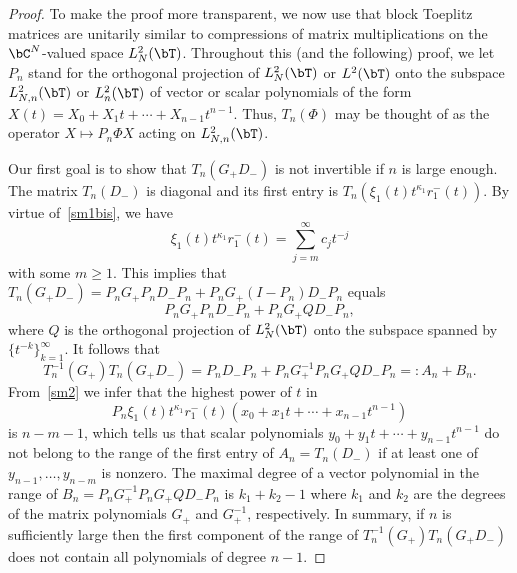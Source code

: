 \documentclass[addpoints,12pt,letter]{article}
\newcommand{\ka}{\kappa}
\newcommand{\nf}{\infty}
\newcommand{\Ph}{\Phi}
\renewcommand{\ge}{\geqslant}
\numberwithin{equation}{section}
\theoremstyle{definition}
\begin{document}
\begin{proof}
To make the proof more transparent, we now use that block Toeplitz matrices are unitarily similar to compressions of matrix multiplications on the $\bC^N$-valued space $L^{2}_N(\bT)$.
Throughout this (and the following) proof, we let $P_{n}$ stand for the orthogonal projection of $L^{2}_N(\bT)$ or $L^{2}(\bT)$ onto the subspace $L^{2}_{N,n}(\bT)$ or $L^{2}_{n}(\bT)$ of vector or scalar polynomials of the form $X(t)=X_{0}+X_{1}t+\cdots+X_{n-1}t^{n-1}$.
Thus, $T_{n}(\Ph)$ may be thought of as the operator $X \mapsto P_{n}\Ph X$ acting on $L^{2}_{N,n}(\bT)$.

Our first goal is to show that $T_{n}(G_{+}D_{-})$ is not invertible if $n$ is large enough.
The matrix $T_{n}(D_{-})$ is diagonal and its first entry is $T_{n}(\xi_{1}(t) t^{\ka_{1}}r_{1}^{-}(t))$.
By virtue of~\eqref{sm1bis}, we have
\begin{equation}\label{sm2}
\xi_{1}(t) t^{\ka_{1}}r_{1}^{-}(t)=\sum_{j=m}^{\nf}c_{j}t^{-j}
\end{equation}
with some $m\ge 1$.
This implies that $T_{n}(G_{+}D_{-})=P_{n}G_{+}P_{n}D_{-}P_{n}+P_{n}G_{+}(I-P_{n})D_{-}P_{n}$ equals
\[
P_{n}G_{+}P_{n} D_- P_{n}+P_{n}G_{+}QD_{-}P_{n},
\]
where $Q$ is the orthogonal projection of $L^{2}_N(\bT)$ onto the subspace spanned by $\{t^{-k}\}_{k=1}^{\nf}$.
It follows that
\[
T_{n}^{-1}(G_{+})T_{n}(G_{+}D_{-})=P_{n} D_{-} P_{n}+P_{n} G_{+}^{-1} P_{n} G_{+} QD_{-} P_{n}=: A_{n}+B_{n}.
\]
From~\eqref{sm2} we infer that the highest power of $t$ in
\[
P_{n}\xi_{1}(t) t^{\ka_{1}}r_{1}^{-}(t)(x_{0}+x_{1}t+\cdots+x_{n-1}t^{n-1})
\]
is $n-m-1$, which tells us that scalar polynomials $y_{0}+y_{1}t+\cdots+y_{n-1}t^{n-1}$ do not belong to the range of the first entry of $A_{n}=T_{n}(D_{-})$ if at least one of $y_{n-1}, \ldots, y_{n-m}$ is nonzero.
The maximal degree of a vector polynomial in the range of $B_{n}=P_{n} G_{+}^{-1} P_{n} G_{+} QD_{-} P_{n}$ is $k_{1}+k_{2}-1$ where $k_{1}$ and $k_{2}$ are the degrees of the matrix polynomials $G_{+}$ and $G_{+}^{-1}$, respectively.
In summary, if $n$ is sufficiently large then the first component of the range of $T_{n}^{-1}(G_{+})T_{n}(G_{+}D_{-})$ does not contain all polynomials of degree $n-1$.


\end{proof}
\end{document}

